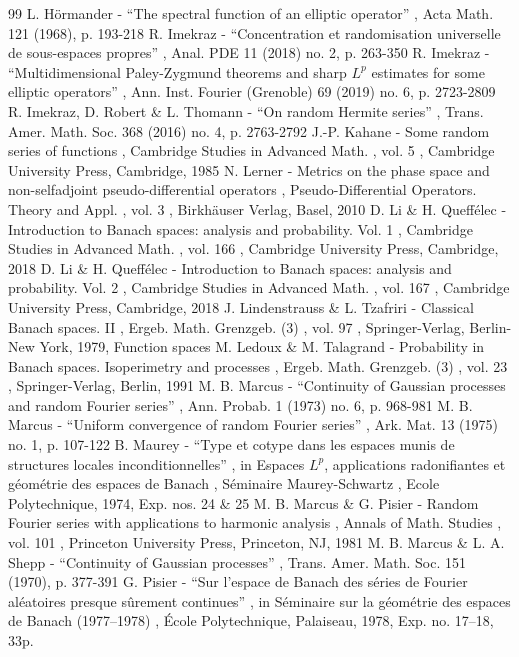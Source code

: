 \documentclass[11pt]{article}
\theoremstyle{theorem}
\theoremstyle{definition}
\begin{document}
\begin{thebibliography}{99}
 L. Hörmander - “The spectral function of an elliptic operator” , Acta Math. 121 (1968), p. 193-218
 R. Imekraz - “Concentration et randomisation universelle de sous-espaces propres” , Anal. PDE 11 (2018) no. 2, p. 263-350
 R. Imekraz - “Multidimensional Paley-Zygmund theorems and sharp ${L}^p$ estimates for some elliptic operators” , Ann. Inst. Fourier (Grenoble) 69 (2019) no. 6, p. 2723-2809
 R. Imekraz, D. Robert \& L. Thomann - “On random Hermite series” , Trans. Amer. Math. Soc. 368 (2016) no. 4, p. 2763-2792
 J.-P. Kahane - Some random series of functions , Cambridge Studies in Advanced Math. , vol. 5 , Cambridge University Press, Cambridge, 1985
 N. Lerner - Metrics on the phase space and non-selfadjoint pseudo-differential operators , Pseudo-Differential Operators. Theory and Appl. , vol. 3 , Birkhäuser Verlag, Basel, 2010
 D. Li \& H. Queffélec - Introduction to Banach spaces: analysis and probability. Vol. 1 , Cambridge Studies in Advanced Math. , vol. 166 , Cambridge University Press, Cambridge, 2018
 D. Li \& H. Queffélec - Introduction to Banach spaces: analysis and probability. Vol. 2 , Cambridge Studies in Advanced Math. , vol. 167 , Cambridge University Press, Cambridge, 2018
 J. Lindenstrauss \& L. Tzafriri - Classical Banach spaces. II , Ergeb. Math. Grenzgeb. (3) , vol. 97 , Springer-Verlag, Berlin-New York, 1979, Function spaces
 M. Ledoux \& M. Talagrand - Probability in Banach spaces. Isoperimetry and processes , Ergeb. Math. Grenzgeb. (3) , vol. 23 , Springer-Verlag, Berlin, 1991
 M. B. Marcus - “Continuity of Gaussian processes and random Fourier series” , Ann. Probab. 1 (1973) no. 6, p. 968-981
 M. B. Marcus - “Uniform convergence of random Fourier series” , Ark. Mat. 13 (1975) no. 1, p. 107-122
 B. Maurey - “Type et cotype dans les espaces munis de structures locales inconditionnelles” , in Espaces $L^{p}$, applications radonifiantes et géométrie des espaces de Banach , Séminaire Maurey-Schwartz , Ecole Polytechnique, 1974, Exp. nos. 24 \& 25
 M. B. Marcus \& G. Pisier - Random Fourier series with applications to harmonic analysis , Annals of Math. Studies , vol. 101 , Princeton University Press, Princeton, NJ, 1981
 M. B. Marcus \& L. A. Shepp - “Continuity of Gaussian processes” , Trans. Amer. Math. Soc. 151 (1970), p. 377-391
 G. Pisier - “Sur l’espace de Banach des séries de Fourier aléatoires presque sûrement continues” , in Séminaire sur la géométrie des espaces de Banach (1977–1978) , École Polytechnique, Palaiseau, 1978, Exp. no. 17–18, 33p.

\end{thebibliography}
\end{document}
